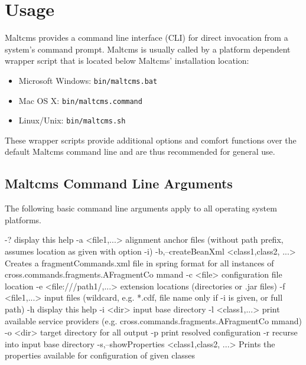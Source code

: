 \chapter{Usage}
Maltcms provides a command line interface (CLI) for direct invocation 
from a system's command prompt. Maltcms is usually called by a platform 
dependent wrapper script that is located below Maltcms' installation location:
\begin{itemize}
	\item Microsoft Windows: \verb|bin/maltcms.bat|
	\item Mac OS X: \verb|bin/maltcms.command|
	\item Linux/Unix: \verb|bin/maltcms.sh|
\end{itemize}
These wrapper scripts provide additional options and comfort functions 
over the default Maltcms command line and are thus recommended for general use.

\section{Maltcms Command Line Arguments}
The following basic command line arguments apply to all operating system platforms.

-?                                         display this help
 -a <file1,...>                             alignment anchor files (without path
                                            prefix, assumes location as given
                                            with option -i)
 -b,--createBeanXml <class1,class2, ...>    Creates a fragmentCommands.xml file
                                            in spring format for all instances
                                            of
                                            cross.commands.fragments.AFragmentCo
                                            mmand
 -c <file>                                  configuration file location
 -e <file:///path1/,...>                    extension locations (directories or
                                            .jar files)
 -f <file1,...>                             input files (wildcard, e.g. *.cdf,
                                            file name only if -i is given, or
                                            full path)
 -h                                         display this help
 -i <dir>                                   input base directory
 -l <class1,...>                            print available service providers
                                            (e.g.
                                            cross.commands.fragments.AFragmentCo
                                            mmand)
 -o <dir>                                   target directory for all output
 -p                                         print resolved configuration
 -r                                         recurse into input base directory
 -s,--showProperties <class1,class2, ...>   Prints the properties available for
                                            configuration of given classes

